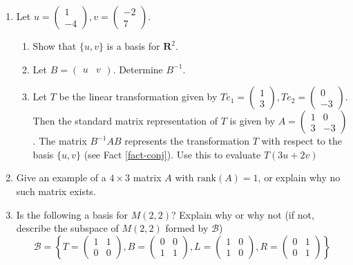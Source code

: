 \documentclass[12pt]{article}
\numberwithin{equation}{subsection}
\numberwithin{figure}{subsection}
\theoremstyle{note}
\newcommand\rank[1]{\mathrm{rank}(#1)}
\begin{document}
\begin{enumerate}[label=\arabic*.]
	\item Let $u=\begin{pmatrix} 1 \\ -4 \end{pmatrix}, v=\begin{pmatrix} -2 \\ 7\end{pmatrix}$.
	\begin{enumerate}
		\item Show that $\{u,v\}$ is a basis for $\mathbf{R}^2$. 
		\item Let $B=\begin{pmatrix} u & v\end{pmatrix}$. Determine $B^{-1}$.
		\item Let $T$ be the linear transformation given by $Te_1=\begin{pmatrix} 1 \\ 3\end{pmatrix}, Te_2=\begin{pmatrix} 0 \\ -3\end{pmatrix}$. Then the standard matrix representation of $T$ is given by $A=\begin{pmatrix} 1 & 0 \\ 3 & -3\end{pmatrix}$. The matrix $B^{-1}AB$ represents the transformation $T$ with respect to the basis $\{u,v\}$ (see Fact \ref{fact-conj}). Use this to evaluate $T(3u+2v)$
	\end{enumerate}

	\item Give an example of a $4\times 3$ matrix $A$ with $\rank{A}=1$, or explain why no such matrix exists. 

	\item Is the following a basis for $M(2,2)$? Explain why or why not (if not, describe the subspace of $M(2,2)$ formed by $\mathcal{B}$)\[\mathcal{B}= \left\{T= \begin{pmatrix} 1 & 1 \\ 0 & 0 \end{pmatrix}, B=\begin{pmatrix} 0 & 0 \\ 1 & 1 \end{pmatrix}, L=\begin{pmatrix} 1 & 0 \\ 1 & 0 \end{pmatrix}, R=\begin{pmatrix} 0 & 1 \\ 0 & 1 \end{pmatrix}\right\}\] 



\end{enumerate}
\end{document}

